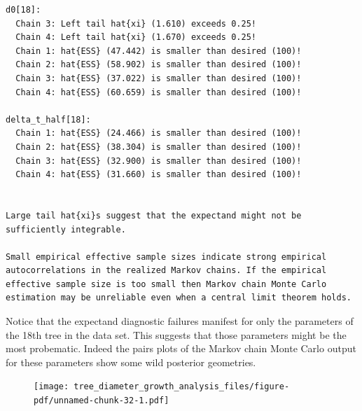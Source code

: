 \documentclass[
  letterpaper,
  DIV=11,
  numbers=noendperiod]{scrartcl}
\newenvironment{Shaded}{\begin{snugshade}}{\end{snugshade}}
\newcommand{\FunctionTok}[1]{\textcolor[rgb]{0.28,0.35,0.67}{#1}}
\newcommand{\NormalTok}[1]{\textcolor[rgb]{0.00,0.23,0.31}{#1}}
\newcommand{\OtherTok}[1]{\textcolor[rgb]{0.00,0.23,0.31}{#1}}
\newcommand{\SpecialCharTok}[1]{\textcolor[rgb]{0.37,0.37,0.37}{#1}}
\newcommand{\StringTok}[1]{\textcolor[rgb]{0.13,0.47,0.30}{#1}}
\begin{document}
\begin{verbatim}
d0[18]:
  Chain 3: Left tail hat{xi} (1.610) exceeds 0.25!
  Chain 4: Left tail hat{xi} (1.670) exceeds 0.25!
  Chain 1: hat{ESS} (47.442) is smaller than desired (100)!
  Chain 2: hat{ESS} (58.902) is smaller than desired (100)!
  Chain 3: hat{ESS} (37.022) is smaller than desired (100)!
  Chain 4: hat{ESS} (60.659) is smaller than desired (100)!

delta_t_half[18]:
  Chain 1: hat{ESS} (24.466) is smaller than desired (100)!
  Chain 2: hat{ESS} (38.304) is smaller than desired (100)!
  Chain 3: hat{ESS} (32.900) is smaller than desired (100)!
  Chain 4: hat{ESS} (31.660) is smaller than desired (100)!


Large tail hat{xi}s suggest that the expectand might not be
sufficiently integrable.

Small empirical effective sample sizes indicate strong empirical
autocorrelations in the realized Markov chains. If the empirical
effective sample size is too small then Markov chain Monte Carlo
estimation may be unreliable even when a central limit theorem holds.
\end{verbatim}

Notice that the expectand diagnostic failures manifest for only the
parameters of the 18th tree in the data set. This suggests that those
parameters might be the most probematic. Indeed the pairs plots of the
Markov chain Monte Carlo output for these parameters show some wild
posterior geometries.

\begin{Shaded}
\end{Shaded}

\begin{figure}[H]

{\centering \texttt{[image: tree\_diameter\_growth\_analysis\_files/figure-pdf/unnamed-chunk-32-1.pdf]}

}

\end{figure}
\end{document}
